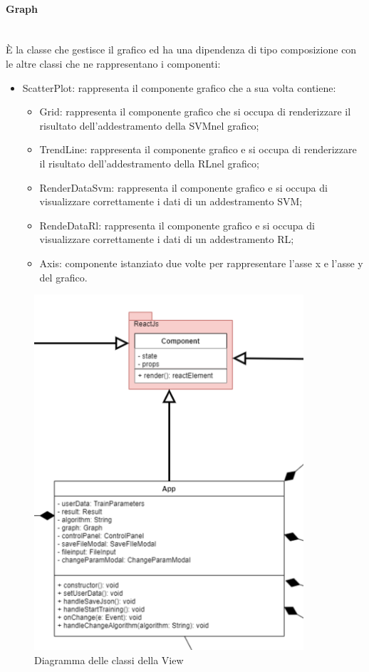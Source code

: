 		\paragraph*{Graph} \mbox{} \\[1mm]
		È la classe che gestisce il grafico ed ha una dipendenza di tipo composizione con le altre classi che ne rappresentano i componenti:
		\begin{itemize}
			\item ScatterPlot: rappresenta il componente grafico che a sua volta contiene: \begin{itemize}
				\item Grid: rappresenta il componente grafico che si occupa di renderizzare il risultato dell'addestramento della SVM\glosp nel grafico;
				\item TrendLine: rappresenta il componente grafico e si occupa di renderizzare il risultato dell'addestramento della RL\glosp nel grafico;
				\item RenderDataSvm: rappresenta il componente grafico e si occupa di visualizzare correttamente i dati di un addestramento SVM\glo;
				\item RendeDataRl: rappresenta il componente grafico e si occupa di visualizzare correttamente i dati di un addestramento RL\glo;
				\item Axis: componente istanziato due volte per rappresentare l'asse x e l'asse y del grafico.
			\end{itemize}
		\end{itemize}
		\mbox{}
				\begin{figure} [H]
					\begin{center}
						\includegraphics[width=100mm]{img/Diagrammi/view-app.png}
					\end{center}
					\caption{Diagramma delle classi della View}
				\end{figure}
